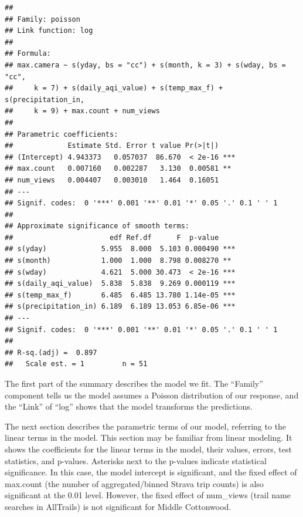 \documentclass[
]{book}
\newenvironment{Shaded}{\begin{snugshade}}{\end{snugshade}}
\newcommand{\CommentTok}[1]{\textcolor[rgb]{0.56,0.35,0.01}{\textit{#1}}}
\begin{document}
\begin{verbatim}
## 
## Family: poisson 
## Link function: log 
## 
## Formula:
## max.camera ~ s(yday, bs = "cc") + s(month, k = 3) + s(wday, bs = "cc", 
##     k = 7) + s(daily_aqi_value) + s(temp_max_f) + s(precipitation_in, 
##     k = 9) + max.count + num_views
## 
## Parametric coefficients:
##             Estimate Std. Error t value Pr(>|t|)    
## (Intercept) 4.943373   0.057037  86.670  < 2e-16 ***
## max.count   0.007160   0.002287   3.130  0.00581 ** 
## num_views   0.004407   0.003010   1.464  0.16051    
## ---
## Signif. codes:  0 '***' 0.001 '**' 0.01 '*' 0.05 '.' 0.1 ' ' 1
## 
## Approximate significance of smooth terms:
##                       edf Ref.df      F  p-value    
## s(yday)             5.955  8.000  5.103 0.000490 ***
## s(month)            1.000  1.000  8.798 0.008270 ** 
## s(wday)             4.621  5.000 30.473  < 2e-16 ***
## s(daily_aqi_value)  5.838  5.838  9.269 0.000119 ***
## s(temp_max_f)       6.485  6.485 13.780 1.14e-05 ***
## s(precipitation_in) 6.189  6.189 13.053 6.85e-06 ***
## ---
## Signif. codes:  0 '***' 0.001 '**' 0.01 '*' 0.05 '.' 0.1 ' ' 1
## 
## R-sq.(adj) =  0.897   
##   Scale est. = 1         n = 51
\end{verbatim}

\begin{Shaded}
\end{Shaded}

The first part of the summary describes the model we fit. The ``Family'' component tells us the model assumes a Poisson distribution of our response, and the ``Link'' of ``log'' shows that the model transforms the predictions.

The next section describes the parametric terms of our model, referring to the linear terms in the model. This section may be familiar from linear modeling. It shows the coefficients for the linear terms in the model, their values, errors, test statistics, and p-values. Asterisks next to the p-values indicate statistical significance. In this case, the model intercept is significant, and the fixed effect of max.count (the number of aggregated/binned Strava trip counts) is also significant at the 0.01 level. However, the fixed effect of num\_views (trail name searches in AllTrails) is not significant for Middle Cottonwood.
\end{document}
